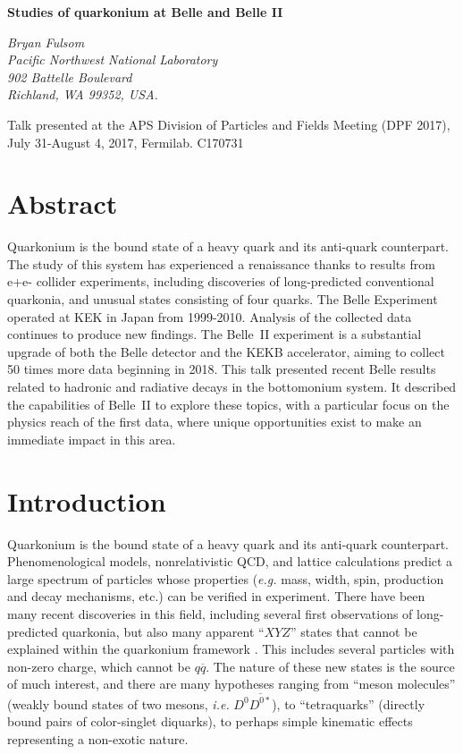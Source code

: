 \documentclass[12pt]{article}
\def\Title#1{\begin{center} {\Large {\bf #1} } \end{center}}
\begin{document}
\Title{Studies of quarkonium at Belle and Belle II}

\bigskip\bigskip

\begin{raggedright}  

{\it Bryan Fulsom\\
Pacific Northwest National Laboratory\\
902 Battelle Boulevard\\
Richland, WA 99352, USA.}
\bigskip\bigskip
\end{raggedright}

Talk presented at the APS Division of Particles and Fields Meeting (DPF 2017), July 31-August 4, 2017, Fermilab. C170731

\section{Abstract}
Quarkonium is the bound state of a heavy quark and its anti-quark counterpart. The study of this system has experienced a renaissance thanks to results from e+e- collider experiments, including discoveries of long-predicted conventional quarkonia, and unusual states consisting of four quarks. The Belle Experiment operated at KEK in Japan from 1999-2010. Analysis of the collected data continues to produce new findings. The Belle~II experiment is a substantial upgrade of both the Belle detector and the KEKB accelerator, aiming to collect 50 times more data beginning in 2018. This talk presented recent Belle results related to hadronic and radiative decays in the bottomonium system. It described the capabilities of Belle~II to explore these topics, with a particular focus on the physics reach of the first data, where unique opportunities exist to make an immediate impact in this area.

\section{Introduction}
Quarkonium is the bound state of a heavy quark and its anti-quark counterpart. Phenomenological models, nonrelativistic QCD, and lattice calculations predict a large spectrum of particles whose properties (\emph{e.g.} mass, width, spin, production and decay mechanisms, etc.) can be verified in experiment. There have been many recent discoveries in this field, including several first observations of long-predicted quarkonia, but also many apparent ``$XYZ$'' states that cannot be explained within the quarkonium framework \cite{qqbar_review}. This includes several particles with non-zero charge, which cannot be $q\overline{q}$. The nature of these new states is the source of much interest, and there are many hypotheses ranging from ``meson molecules'' (weakly bound states of two mesons, \emph{i.e.} $D^{0}\overline{D^{0*}}$), to ``tetraquarks'' (directly bound pairs of color-singlet diquarks), to perhaps simple kinematic effects representing a non-exotic nature.
\end{document}
